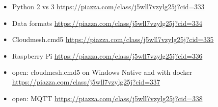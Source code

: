 \begin{itemize}

\item
  Python 2 vs 3 \url{https://piazza.com/class/j5wll7vzylg25j?cid=333}
\item
  Data formats \url{https://piazza.com/class/j5wll7vzylg25j?cid=334}
\item
  Cloudmesh.cmd5 \url{https://piazza.com/class/j5wll7vzylg25j?cid=335}
\item
  Raspberry Pi \url{https://piazza.com/class/j5wll7vzylg25j?cid=336}
\item
  open: cloudmesh.cmd5 on Windows Native and with docker
  \url{https://piazza.com/class/j5wll7vzylg25j?cid=337}
\item
  open: MQTT \url{https://piazza.com/class/j5wll7vzylg25j?cid=338}
    
\end{itemize}
